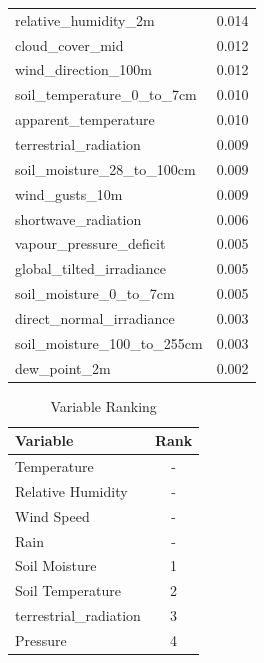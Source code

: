 \begin{table}[H]
\begin{tabular}{lc}
		relative\_humidity\_2m                & 0.014       \\ 
		cloud\_cover\_mid                     & 0.012       \\ 
		wind\_direction\_100m                 & 0.012       \\ 
		soil\_temperature\_0\_to\_7cm           & 0.010       \\ 
		apparent\_temperature                 & 0.010       \\ 
		terrestrial\_radiation                 & 0.009       \\ 
		soil\_moisture\_28\_to\_100cm          & 0.009       \\ 
		wind\_gusts\_10m                      & 0.009       \\ 
		shortwave\_radiation                   & 0.006       \\ 
		vapour\_pressure\_deficit             & 0.005       \\ 
		global\_tilted\_irradiance             & 0.005       \\ 
		soil\_moisture\_0\_to\_7cm             & 0.005       \\ 
		direct\_normal\_irradiance             & 0.003       \\ 
		soil\_moisture\_100\_to\_255cm         & 0.003       \\ 
		dew\_point\_2m                        & 0.002       \\ 
	\end{tabular}
\end{table}

\begin{table}[H]
	\caption{Variable Ranking}
	\centering
	\label{feature_importances}
	\begin{tabular}{lc}
		\hline
		Variable                                & Rank \\ \hline
		Temperature                            & -       \\ 
		Relative Humidity                      & -       \\
		Wind Speed                             & -       \\
		Rain                                   & -       \\
		Soil Moisture                          & 1       \\
		Soil Temperature                       & 2       \\ 
		terrestrial\_radiation                       & 3       \\ 
		Pressure                 & 4 \\
	\end{tabular}
\end{table}





